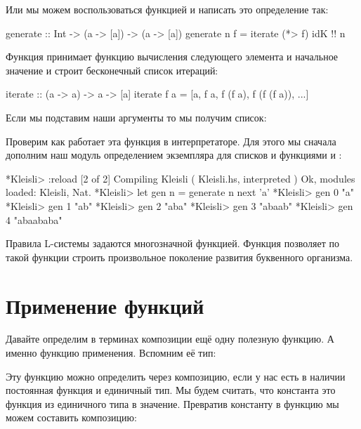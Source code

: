 Или мы можем воспользоваться функцией  и написать это
определение так:


\begin{code}
generate :: Int -> (a -> [a]) -> (a -> [a])
generate n f = iterate (*> f) idK !! n
\end{code}

Функция  принимает функцию вычисления следующего элемента и
начальное значение и строит бесконечный список итераций:


\begin{code}
iterate :: (a -> a) -> a -> [a]
iterate f a = [a, f a, f (f a), f (f (f a)), ...]
\end{code}

Если мы подставим наши аргументы то мы получим список:


\begin{code}
[id, f, f*>f, f*>f*>f, f*>f*>f*>f, ...]
\end{code}

Проверим как работает эта функция в интерпретаторе. Для этого мы сначала
дополним наш модуль  определением экземпляра для списков и
функциями  и :


\begin{code}
*Kleisli> :reload
[2 of 2] Compiling Kleisli          ( Kleisli.hs, interpreted )
Ok, modules loaded: Kleisli, Nat.
*Kleisli> let gen n = generate n next 'a'
*Kleisli> gen 0
"a"
*Kleisli> gen 1
"ab"
*Kleisli> gen 2
"aba"
*Kleisli> gen 3
"abaab"
*Kleisli> gen 4
"abaababa"
\end{code}

Правила L-системы задаются многозначной функцией. Функция 
позволяет по такой функции строить произвольное поколение развития
буквенного организма.

\section{Применение функций}

Давайте определим в терминах композиции ещё одну полезную функцию. А
именно функцию применения. Вспомним её тип:



Эту функцию можно определить через композицию, если у нас есть в наличии
постоянная функция и единичный тип. Мы будем считать, что константа это
функция из единичного типа в значение. Превратив константу в функцию мы
можем составить композицию:


